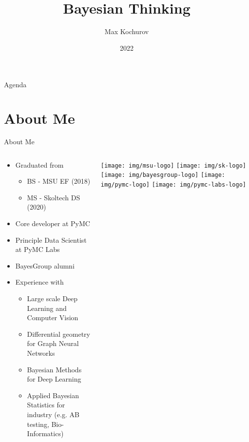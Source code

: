 \documentclass{beamer}
\author{Max Kochurov}
\title[Practical Bayes - Bayesian Thinking]{Bayesian Thinking}
\institute[MSU]{Moscow State University}
\date{2022}
\begin{document}

\begin{frame}
	\maketitle
\end{frame}

\begin{frame}{Agenda}
\tableofcontents
\end{frame}
\nologo
\section{About Me}
\begin{frame}{About Me}
\begin{columns}
\begin{column}{0.75\linewidth}
\begin{itemize}
    \item Graduated from 
        \begin{itemize}
            \item BS - MSU EF (2018)
            \item MS - Skoltech DS (2020)
        \end{itemize}
    \item Core developer at PyMC
    \item Principle Data Scientist at PyMC Labs
    \item BayesGroup alumni
    \item Experience with 
    \begin{itemize}
        \item Large scale Deep Learning and Computer Vision
        \item Differential geometry for Graph Neural Networks
        \item Bayesian Methods for Deep Learning
        \item Applied Bayesian Statistics for industry (e.g. AB testing, Bio-Informatics)
    \end{itemize}
\end{itemize}
\end{column}
\begin{column}{0.25\linewidth}
\texttt{[image: img/msu-logo]}
\texttt{[image: img/sk-logo]}
\texttt{[image: img/bayesgroup-logo]}
\texttt{[image: img/pymc-logo]}
\texttt{[image: img/pymc-labs-logo]}
\end{column}
\end{columns}
\end{frame}
\end{document}

